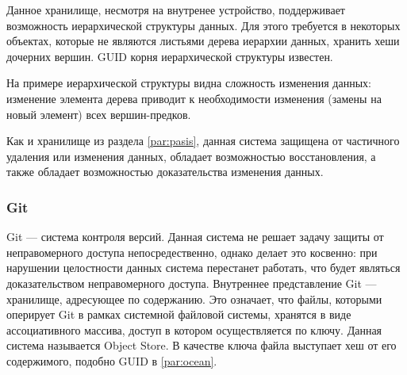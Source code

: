 Данное хранилище, несмотря на внутренее устройство, поддерживает возможность иерархической структуры данных. Для этого требуется в некоторых объектах, которые не являются листьями дерева иерархии данных, хранить хеши дочерних вершин. GUID корня иерархической структуры известен.

На примере иерархической структуры видна сложность изменения данных: изменение элемента дерева приводит к необходимости изменения (замены на новый элемент) всех вершин-предков.

Как и хранилище из раздела \ref{par:pasis}, данная система защищена от частичного удаления или изменения данных, обладает возможностью восстановления, а также обладает возможностью доказательства изменения данных.

\subsubsection{Git}

Git \cite{git} --- система контроля версий. Данная система не решает задачу защиты от неправомерного доступа непосредественно, однако делает это косвенно: при нарушении целостности данных система перестанет работать, что будет являться доказательством неправомерного доступа. Внутреннее представление Git --- хранилище, адресующее по содержанию. Это означает, что файлы, которыми оперирует Git в рамках системной файловой системы, хранятся в виде ассоциативного массива, доступ в котором осуществляется по ключу. Данная система называется Object Store. В качестве ключа файла выступает хеш от его содержимого, подобно GUID в \ref{par:ocean}.

